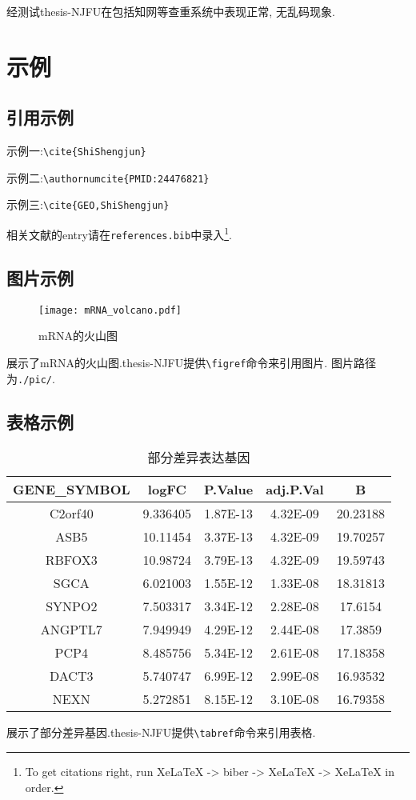 \documentclass[12pt]{thesis-NJFU}
\begin{document}
经测试thesis-NJFU在包括知网等查重系统中表现正常, 无乱码现象.

\section{示例}

\subsection{引用示例}
示例一\cite{ShiShengjun}:\verb|\cite{ShiShengjun}|

示例二:\verb|\authornumcite{PMID:24476821}|

示例三\cite{GEO,ShiShengjun}:\verb|\cite{GEO,ShiShengjun}|

相关文献的entry请在\verb|references.bib|中录入\footnote{To get citations right, run XeLaTeX -> biber -> XeLaTeX -> XeLaTeX in order.}.

\subsection{图片示例}
\begin{figure}[htbp]
	\centering
	\texttt{[image: mRNA\_volcano.pdf]}
	\caption{mRNA的火山图}
      \label{fig:volcano_mRNA}
\end{figure}
展示了mRNA的火山图.thesis-NJFU提供\verb|\figref|命令来引用图片.
图片路径为\verb|./pic/|.

\subsection{表格示例}

\begin{table}[htbp]
    \centering
    \caption{部分差异表达基因}
      \begin{tabular}{ccccc}
      \toprule
      GENE\_SYMBOL & logFC & P.Value & adj.P.Val & B \\
      \midrule
      C2orf40 & 9.336405 & 1.87E-13 & 4.32E-09 & 20.23188 \\
      ASB5  & 10.11454 & 3.37E-13 & 4.32E-09 & 19.70257 \\
      RBFOX3 & 10.98724 & 3.79E-13 & 4.32E-09 & 19.59743 \\
      SGCA  & 6.021003 & 1.55E-12 & 1.33E-08 & 18.31813 \\
      SYNPO2 & 7.503317 & 3.34E-12 & 2.28E-08 & 17.6154 \\
      ANGPTL7 & 7.949949 & 4.29E-12 & 2.44E-08 & 17.3859 \\
      PCP4  & 8.485756 & 5.34E-12 & 2.61E-08 & 17.18358 \\
      DACT3 & 5.740747 & 6.99E-12 & 2.99E-08 & 16.93532 \\
      NEXN  & 5.272851 & 8.15E-12 & 3.10E-08 & 16.79358 \\
      \bottomrule
    \end{tabular}%
    \label{tab:degs}%
  \end{table}%
展示了部分差异基因.thesis-NJFU提供\verb|\tabref|命令来引用表格.
\end{document}
